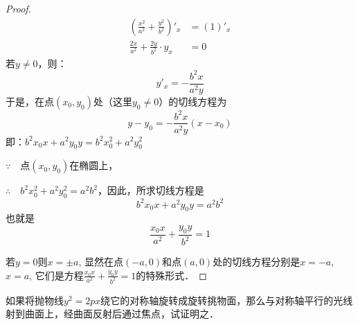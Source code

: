 \begin{proof}
\begin{align*}
    \left(\frac{x^2}{a^2}+\frac{y^2}{b^2}\right)'_x&=(1)'_x\\
    \frac{2x}{a^2}+\frac{2y}{b^2}\cdot y_x&=0
\end{align*}
若$y\ne 0$，则：
\[y'_x=-\frac{b^2x}{a^2y}\]
于是，在点$(x_0,y_0)$处（这里$y_0\ne 0$）的切线方程为
\[y-y_0=-\frac{b^2x}{a^2y}(x-x_0)\]
即：$b^2x_0x+a^2y_0y=b^2x^2_0+a^2y^2_0$

$\because\quad $点$(x_0,y_0)$在椭圆上，

$\therefore\quad b^2x_0^2+a^2y^2_0=a^2b^2$，因此，所求切线方程是
\[b^2x_0 x+a^2y_0 y=a^2b^2\]
也就是
\[\frac{x_0x}{a^2}+\frac{y_0y}{b^2}=1\]

若$y=0$则$x=\pm a$, 显然在点$(-a,0)$和点$(a,0)$处的切线方程分别是$x=-a$, $x=a$, 它们是方程$\frac{x_0x}{a^2}+\frac{y_0y}{b^2}=1$的特殊形式．
\end{proof}
    
\begin{example}
    如果将抛物线$y^2=2px$绕它的对称轴旋转成旋转挑物面，那么与对称轴平行的光线射到曲面上，经曲面反射后通过焦点，试证明之．
\end{example}


